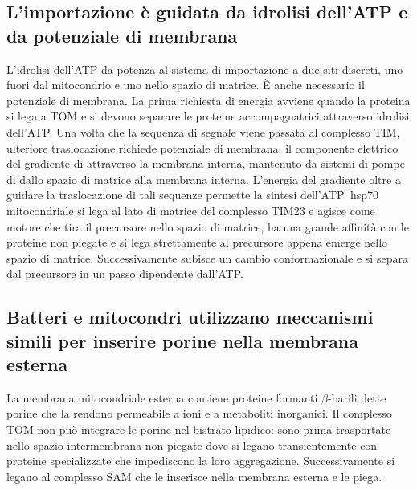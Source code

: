 \subsection{L'importazione \`e guidata da idrolisi dell'ATP e da potenziale di membrana}
L'idrolisi dell'ATP da potenza al sistema di importazione a due siti discreti, uno fuori dal mitocondrio e uno nello spazio di matrice. \`E anche necessario il potenziale di membrana.
La prima richiesta di energia avviene quando la proteina si lega a TOM e si devono separare le proteine accompagnatrici attraverso idrolisi dell'ATP. Una volta che la sequenza di segnale
viene passata al complesso TIM, ulteriore traslocazione richiede potenziale di membrana, il componente elettrico del gradiente di  attraverso la membrana interna, mantenuto
da sistemi di pompe di  dallo spazio di matrice alla membrana interna. L'energia del gradiente oltre a guidare la traslocazione di tali sequenze permette la sintesi dell'ATP.
hsp70 mitocondriale si lega al lato di matrice del complesso TIM23 e agisce come motore che tira il precursore nello spazio di matrice, ha una grande affinit\`a con le proteine non 
piegate e si lega strettamente al precursore appena emerge nello spazio di matrice. Successivamente subisce un cambio conformazionale e si separa dal precursore in un passo dipendente
dall'ATP. 
\subsection{Batteri e mitocondri utilizzano meccanismi simili per inserire porine nella membrana esterna}
La membrana mitocondriale esterna contiene proteine formanti $\beta$-barili dette porine che la rendono permeabile a ioni e a metaboliti inorganici. Il complesso TOM non pu\`o 
integrare  le porine nel bistrato lipidico: sono prima trasportate nello spazio intermembrana non piegate dove si legano transientemente con proteine specializzate che impediscono 
la loro aggregazione. Successivamente si legano al complesso SAM che le inserisce nella membrana esterna e le piega. 
